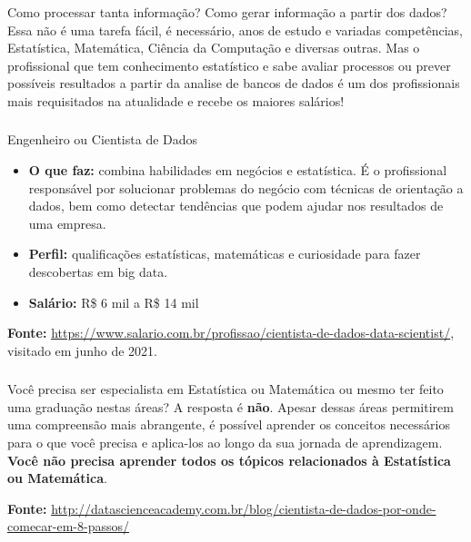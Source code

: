 \documentclass[12pt]{beamer}
\begin{document}
\begin{frame}{}
\frametitle{}
\begin{block}{}
\justifying
Como processar tanta informação? Como gerar informação a partir dos dados? Essa não é uma tarefa fácil, é necessário, anos de estudo e variadas competências, Estatística, Matemática, Ciência da Computação e diversas outras. Mas o profissional que tem conhecimento estatístico e sabe avaliar processos ou prever possíveis resultados a partir da analise de bancos de dados é um dos profissionais mais requisitados na atualidade e recebe os maiores salários!
\end{block}
\end{frame}

\begin{frame}{}
\frametitle{}
\begin{block}{Engenheiro ou Cientista de Dados}
\begin{itemize}
\justifying
\item {\bf O que faz:} combina habilidades em negócios e estatística. É o profissional responsável por solucionar problemas do negócio com técnicas de orientação a dados, bem como detectar tendências que podem ajudar nos resultados de uma empresa.
\item {\bf Perfil:} qualificações estatísticas, matemáticas e curiosidade para fazer descobertas em big data.
\item {\bf Salário:} R\$ 6 mil a R\$ 14 mil\\
\end{itemize}
{\bf Fonte:} \url{https://www.salario.com.br/profissao/cientista-de-dados-data-scientist/}, visitado em junho de 2021.
\end{block}
\end{frame}


\begin{frame}{}
\frametitle{}
\begin{block}{}
\justifying
Você precisa ser especialista em Estatística ou Matemática ou mesmo ter feito uma graduação nestas áreas? \pause A resposta é {\bf não}. \pause Apesar dessas áreas permitirem uma compreensão mais abrangente, é possível aprender os conceitos necessários para o que você precisa e aplica-los ao longo da sua jornada de aprendizagem. \textbf{Você não precisa aprender todos os tópicos relacionados à Estatística ou Matemática}.

{\bf Fonte:} \url{http://datascienceacademy.com.br/blog/cientista-de-dados-por-onde-comecar-em-8-passos/}
\end{block}
\end{frame}
\end{document}
